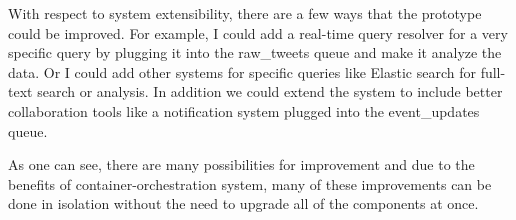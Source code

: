 With respect to system extensibility, there are a few ways that the prototype could be improved. For example, I could add a real-time query resolver for a very specific query by plugging it into the raw\_tweets queue and make it analyze the data. Or I could add other systems for specific queries like Elastic search for full-text search or analysis. In addition we could extend the system to include better collaboration tools like a notification system plugged into the event\_updates queue.

As one can see, there are many possibilities for improvement and due to the benefits of container-orchestration system, many of these improvements can be done in isolation without the need to upgrade all of the components at once.
